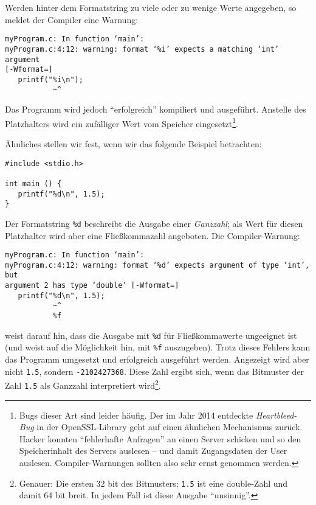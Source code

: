 Werden hinter dem Formatstring zu viele oder zu wenige Werte angegeben, so meldet der Compiler eine Warnung:
\begin{cmdbox}
\begin{verbatim}
myProgram.c: In function ‘main’:
myProgram.c:4:12: warning: format ‘%i’ expects a matching ‘int’ argument
[-Wformat=]
   printf("%i\n");
           ~^
\end{verbatim}
\end{cmdbox}
Das Programm wird jedoch \enquote{erfolgreich} kompiliert und ausgeführt. Anstelle des Platzhalters wird ein zufälliger Wert vom Speicher eingesetzt\footnote{Bugs dieser Art sind leider häufig. Der im Jahr 2014 entdeckte \emph{Heartbleed-Bug} in der OpenSSL-Library geht auf einen ähnlichen Mechanismus zurück. Hacker konnten \enquote{fehlerhafte Anfragen} an einen Server schicken und so den Speicherinhalt des Servers auslesen -- und damit \eg Zugangsdaten der User auslesen. Compiler-Warnungen sollten also sehr ernst genommen werden.}.

Ähnliches stellen wir fest, wenn wir das folgende Beispiel betrachten:

\begin{codebox}
\begin{verbatim}
#include <stdio.h>

int main () {
   printf("%d\n", 1.5);
}
\end{verbatim}
\end{codebox}
Der Formatstring \texttt{\%d} beschreibt die Ausgabe einer \emph{Ganzzahl}; als Wert für diesen Platzhalter wird aber eine Fließkommazahl angeboten. Die Compiler-Warnung:

\begin{cmdbox}
\begin{verbatim}
myProgram.c: In function ‘main’:
myProgram.c:4:12: warning: format ‘%d’ expects argument of type ‘int’, but
argument 2 has type ‘double’ [-Wformat=]
   printf("%d\n", 1.5);
           ~^
           %f
\end{verbatim}
\end{cmdbox}
weist darauf hin, dass die Ausgabe mit \texttt{\%d} für Fließkommawerte ungeeignet ist (und weist auf die Möglichkeit hin, mit \texttt{\%f} auszugeben). Trotz dieses Fehlers kann das Programm umgesetzt und erfolgreich ausgeführt werden. Angezeigt wird aber nicht \texttt{1.5}, sondern \texttt{-2102427368}. Diese Zahl ergibt sich, wenn das Bitmuster der Zahl \texttt{1.5} als Ganzzahl interpretiert wird\footnote{Genauer: Die ersten 32 bit des Bitmusters; \texttt{1.5} ist eine double-Zahl und damit 64 bit breit. In jedem Fall ist diese Ausgabe \enquote{unsinnig}.}.

